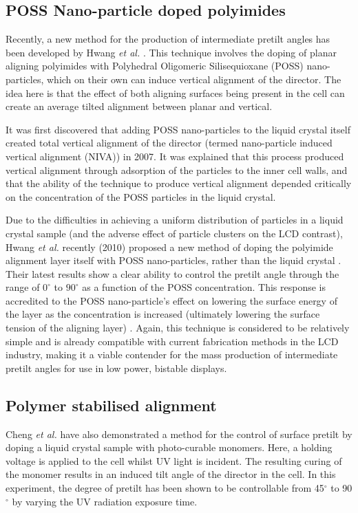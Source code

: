 \subsection{POSS Nano-particle doped polyimides}
Recently, a new method for the production of intermediate pretilt angles has been developed by Hwang \textit{et al.} \cite{Hwang2010}. This technique involves the doping of planar aligning polyimides with Polyhedral Oligomeric Silisequioxane (POSS) nano-particles, which on their own can induce vertical alignment of the director. The idea here is that the effect of both aligning surfaces being present in the cell can create an average tilted alignment between planar and vertical.

It was first discovered that adding POSS nano-particles to the liquid crystal itself created total vertical alignment of the director (termed nano-particle induced vertical alignment (NIVA)) \cite{Jeng2007} in 2007. It was explained that this process produced vertical alignment through adsorption of the particles to the inner cell walls, and that the ability of the technique to produce vertical alignment depended critically on the concentration of the POSS particles in the liquid crystal.

Due to the difficulties in achieving a uniform distribution of particles in a liquid crystal sample (and the adverse effect of particle clusters on the LCD contrast), Hwang \textit{et al.} recently (2010) proposed a new method of doping the polyimide alignment layer itself with POSS nano-particles, rather than the liquid crystal \cite{Hwang2010}. Their latest results show a clear ability to control the pretilt angle through the range of $0^{\circ}$ to $90^{\circ}$ as a function of the POSS concentration. This response is accredited to the POSS nano-particle's effect on lowering the surface energy of the layer as the concentration is increased (ultimately lowering the surface tension of the aligning layer) \cite{Hwang2010}. Again, this technique is considered to be relatively simple and is already compatible with current fabrication methods in the LCD industry, making it a viable contender for the mass production of intermediate pretilt angles for use in low power, bistable displays.

\subsection{Polymer stabilised alignment}
Cheng \textit{et al.} \cite{Chen2008} have also demonstrated a method for the control of surface pretilt by doping a liquid crystal sample with photo-curable monomers. Here, a holding voltage is applied to the cell whilst UV light is incident. The resulting curing of the monomer results in an induced tilt angle of the director in the cell. In this experiment, the degree of pretilt has been shown to be controllable from 45$^{\circ}$ to 90$^{\circ}$ by varying the UV radiation exposure time.

